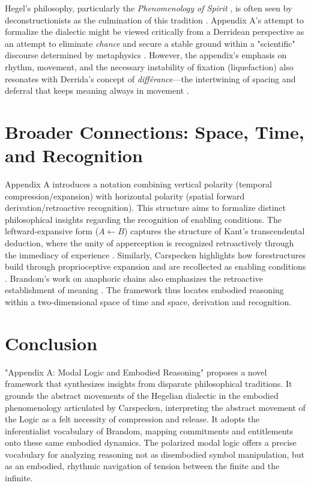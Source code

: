 \documentclass[12pt]{article}
\begin{document}
Hegel's philosophy, particularly the \textit{Phenomenology of Spirit} \parencite{hegel1977phenomenology}, is often seen by deconstructionists as the culmination of this tradition \parencite{Derrida:1973, agamben_language_2006}. Appendix A's attempt to formalize the dialectic might be viewed critically from a Derridean perspective as an attempt to eliminate \textit{chance} and secure a stable ground within a "scientific" discourse determined by metaphysics \parencite{Lucy2004Derrida}. However, the appendix's emphasis on rhythm, movement, and the necessary instability of fixation (liquefaction) also resonates with Derrida's concept of \textit{différance}—the intertwining of spacing and deferral that keeps meaning always in movement \parencite{Derrida:1973}.

\section{Broader Connections: Space, Time, and Recognition}

Appendix A introduces a notation combining vertical polarity (temporal compression/expansion) with horizontal polarity (spatial forward derivation/retroactive recognition). This structure aims to formalize distinct philosophical insights regarding the recognition of enabling conditions. The leftward-expansive form ($A \leftarrow B$) captures the structure of Kant's transcendental deduction, where the unity of apperception is recognized retroactively through the immediacy of experience \parencite{caygill_kant_2004}. Similarly, Carspecken highlights how forestructures build through proprioceptive expansion and are recollected as enabling conditions \parencite{Carspecken1999}. Brandom's work on anaphoric chains also emphasizes the retroactive establishment of meaning \parencite{brandom1994making}. The framework thus locates embodied reasoning within a two-dimensional space of time and space, derivation and recognition.

\section{Conclusion}

"Appendix A: Modal Logic and Embodied Reasoning" proposes a novel framework that synthesizes insights from disparate philosophical traditions. It grounds the abstract movements of the Hegelian dialectic in the embodied phenomenology articulated by Carspecken, interpreting the abstract movement of the Logic as a felt necessity of compression and release. It adopts the inferentialist vocabulary of Brandom, mapping commitments and entitlements onto these same embodied dynamics. The polarized modal logic offers a precise vocabulary for analyzing reasoning not as disembodied symbol manipulation, but as an embodied, rhythmic navigation of tension between the finite and the infinite.

\printbibliography
\end{document}
